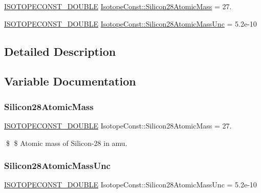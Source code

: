 \begin{DoxyCompactItemize}
\item 
\mbox{\hyperlink{group___isotope_const-_macros_ga8f45a7272ce02c0b4c65c44636ed719a}{I\+S\+O\+T\+O\+P\+E\+C\+O\+N\+S\+T\+\_\+\+D\+O\+U\+B\+LE}} \mbox{\hyperlink{group___isotope_const-_silicon-_si28_gae4187a56e9e2272955756ce28e8bd437}{Isotope\+Const\+::\+Silicon28\+Atomic\+Mass}} = 27.
\item 
\mbox{\hyperlink{group___isotope_const-_macros_ga8f45a7272ce02c0b4c65c44636ed719a}{I\+S\+O\+T\+O\+P\+E\+C\+O\+N\+S\+T\+\_\+\+D\+O\+U\+B\+LE}} \mbox{\hyperlink{group___isotope_const-_silicon-_si28_ga1fa994c63b5ad6b4ff05ab00980ad372}{Isotope\+Const\+::\+Silicon28\+Atomic\+Mass\+Unc}} = 5.\+2e-\/10
\end{DoxyCompactItemize}


\subsection{Detailed Description}


\subsection{Variable Documentation}
\mbox{\label{group___isotope_const-_silicon-_si28_gae4187a56e9e2272955756ce28e8bd437}} 
\subsubsection{\texorpdfstring{Silicon28\+Atomic\+Mass}{Silicon28AtomicMass}}
{\footnotesize\ttfamily \mbox{\hyperlink{group___isotope_const-_macros_ga8f45a7272ce02c0b4c65c44636ed719a}{I\+S\+O\+T\+O\+P\+E\+C\+O\+N\+S\+T\+\_\+\+D\+O\+U\+B\+LE}} Isotope\+Const\+::\+Silicon28\+Atomic\+Mass = 27.}

\$ \$ Atomic mass of Silicon-\/28 in amu. \mbox{\label{group___isotope_const-_silicon-_si28_ga1fa994c63b5ad6b4ff05ab00980ad372}} 
\subsubsection{\texorpdfstring{Silicon28\+Atomic\+Mass\+Unc}{Silicon28AtomicMassUnc}}
{\footnotesize\ttfamily \mbox{\hyperlink{group___isotope_const-_macros_ga8f45a7272ce02c0b4c65c44636ed719a}{I\+S\+O\+T\+O\+P\+E\+C\+O\+N\+S\+T\+\_\+\+D\+O\+U\+B\+LE}} Isotope\+Const\+::\+Silicon28\+Atomic\+Mass\+Unc = 5.\+2e-\/10}

